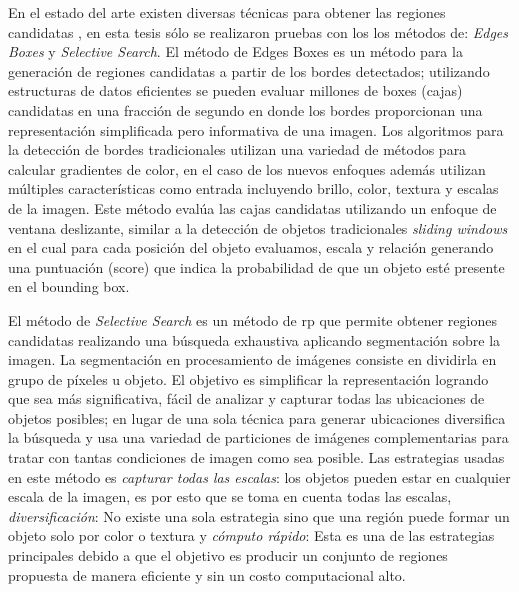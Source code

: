 En el estado del arte existen diversas técnicas para obtener las regiones candidatas \citep{proposal}, en esta tesis  sólo se realizaron pruebas con los  los métodos de: \textit{Edges Boxes} y \textit{Selective Search}. El método de Edges Boxes  \citep{edges} es un método para la generación de regiones candidatas a partir de los bordes detectados; utilizando estructuras de datos eficientes se pueden evaluar millones de boxes (cajas) candidatas en una fracción de segundo en donde los bordes proporcionan una representación simplificada pero informativa de una imagen. Los algoritmos para la detección de bordes tradicionales utilizan una variedad de métodos para calcular gradientes de color, en el caso de los nuevos enfoques además utilizan múltiples características como entrada incluyendo brillo, color, textura y  escalas de la imagen. Este método evalúa las cajas candidatas utilizando un enfoque de ventana deslizante, similar a la detección de objetos tradicionales \textit{sliding windows} en el cual para cada posición del objeto evaluamos, escala y relación generando una puntuación (score) que indica la probabilidad de que un objeto esté presente en el bounding box.


El método de \textit{Selective Search} \citep{selectivesearch} es un método de \ac{rp} que  permite obtener regiones candidatas realizando una búsqueda exhaustiva aplicando segmentación sobre la imagen. La segmentación  en procesamiento de imágenes consiste en dividirla en grupo de píxeles u objeto. El objetivo es simplificar la representación logrando que sea más significativa, fácil de analizar y capturar todas las ubicaciones de objetos posibles; en lugar de una sola técnica para generar ubicaciones diversifica la  búsqueda y usa  una variedad de particiones de imágenes complementarias para tratar con tantas condiciones de imagen como sea posible.
Las estrategias usadas en este método es \textit{capturar todas las escalas}: los objetos pueden estar en cualquier escala de la imagen, es por esto que se toma en cuenta todas las escalas, \textit{diversificación}: No existe una sola estrategia sino que una región puede formar un objeto solo por color o textura y \textit{cómputo rápido}: Esta es una de las estrategias principales debido a que el objetivo es producir un conjunto de regiones propuesta de manera eficiente y sin un costo computacional alto.

